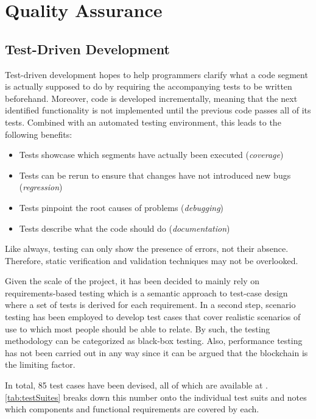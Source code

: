 
\chapter{Quality Assurance}
\label{chp:qualityAssurance}

\section{Test-Driven Development}
Test-driven development hopes to help programmers clarify what a code segment is actually supposed to do by requiring the accompanying tests to be written beforehand. Moreover, code is developed incrementally, meaning that the next identified functionality is not implemented until the previous code passes all of its tests. Combined with an automated testing environment, this leads to the following benefits:

\begin{itemize}
  \item Tests showcase which segments have actually been executed (\textit{coverage})
  \item Tests can be rerun to ensure that changes have not introduced new bugs (\textit{regression})
  \item Tests pinpoint the root causes of problems (\textit{debugging})
  \item Tests describe what the code should do (\textit{documentation})
\end{itemize}

Like always, testing can only show the presence of errors, not their absence. Therefore, static verification and validation techniques may not be overlooked.

Given the scale of the project, it has been decided to mainly rely on requirements-based testing which is a semantic approach to test-case design where a set of tests is derived for each requirement. In a second step, scenario testing has been employed to develop test cases that cover realistic scenarios of use to which most people should be able to relate. By such, the testing methodology can be categorized as black-box testing. Also, performance testing has not been carried out in any way since it can be argued that the blockchain is the limiting factor.

In total, 85 test cases have been devised, all of which are available at \cite{depositRefundGitHub}. \autoref{tab:testSuites} breaks down this number onto the individual test suits and notes which components and functional requirements are covered by each.

